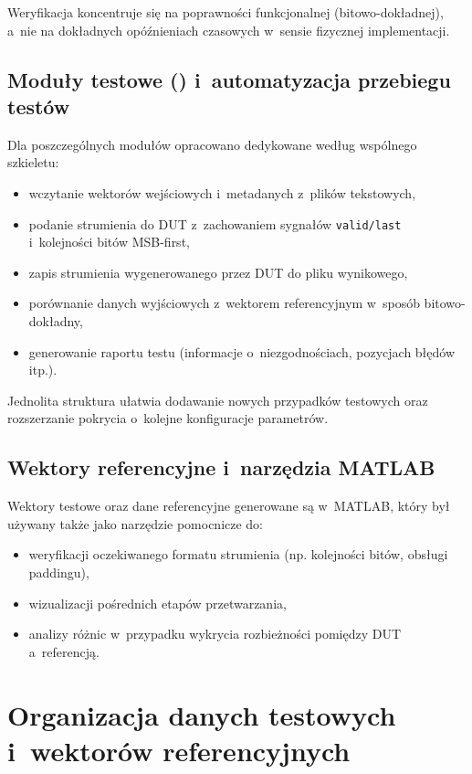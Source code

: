 Weryfikacja koncentruje się na poprawności funkcjonalnej (bitowo-dokładnej), a~nie na dokładnych opóźnieniach czasowych w~sensie fizycznej implementacji.

\subsection{Moduły testowe () i~automatyzacja przebiegu testów}
Dla poszczególnych modułów opracowano dedykowane  według wspólnego szkieletu:
\begin{itemize}
    \item wczytanie wektorów wejściowych i~metadanych z~plików tekstowych,
    \item podanie strumienia do DUT z~zachowaniem sygnałów \texttt{valid/last} i~kolejności bitów MSB-first,
    \item zapis strumienia wygenerowanego przez DUT do pliku wynikowego,
    \item porównanie danych wyjściowych z~wektorem referencyjnym w~sposób bitowo-dokładny,
    \item generowanie raportu testu (informacje o~niezgodnościach, pozycjach błędów itp.).
\end{itemize}

Jednolita struktura  ułatwia dodawanie nowych przypadków testowych oraz rozszerzanie pokrycia o~kolejne konfiguracje parametrów.

\subsection{Wektory referencyjne i~narzędzia MATLAB}
Wektory testowe oraz dane referencyjne generowane są w~MATLAB, który był używany także jako narzędzie pomocnicze do:
\begin{itemize}
    \item weryfikacji oczekiwanego formatu strumienia (np. kolejności bitów, obsługi paddingu),
    \item wizualizacji pośrednich etapów przetwarzania,
    \item analizy różnic w~przypadku wykrycia rozbieżności pomiędzy DUT a~referencją.
\end{itemize}

\section{Organizacja danych testowych i~wektorów referencyjnych}
\label{sec:organizacja_wektorow}

